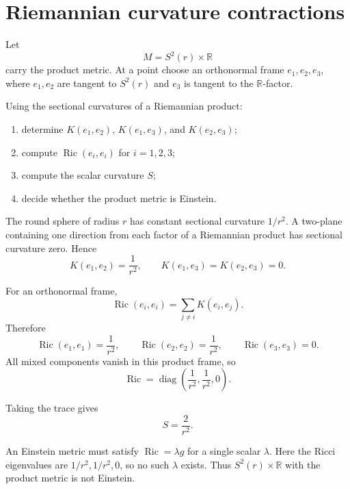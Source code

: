 
\section{Riemannian curvature contractions}

\begin{problem}
\label{prob:vii-gap-27}
Let
\[
M=S^2(r)\times\mathbb{R}
\]
carry the product metric.  At a point choose an orthonormal frame
\(e_1,e_2,e_3\), where \(e_1,e_2\) are tangent to \(S^2(r)\) and
\(e_3\) is tangent to the \(\mathbb{R}\)-factor.

Using the sectional curvatures of a Riemannian product:

\begin{enumerate}
\item determine \(K(e_1,e_2)\), \(K(e_1,e_3)\), and \(K(e_2,e_3)\);
\item compute \(\operatorname{Ric}(e_i,e_i)\) for \(i=1,2,3\);
\item compute the scalar curvature \(S\);
\item decide whether the product metric is Einstein.
\end{enumerate}
\end{problem}

\begin{solution}
The round sphere of radius \(r\) has constant sectional curvature
\(1/r^2\).  A two-plane containing one direction from each factor of a
Riemannian product has sectional curvature zero.  Hence
\[
K(e_1,e_2)=\frac1{r^2},
\qquad
K(e_1,e_3)=K(e_2,e_3)=0.
\]

For an orthonormal frame,
\[
\operatorname{Ric}(e_i,e_i)
 =\sum_{j\ne i}K(e_i,e_j).
\]
Therefore
\[
\operatorname{Ric}(e_1,e_1)=\frac1{r^2},
\qquad
\operatorname{Ric}(e_2,e_2)=\frac1{r^2},
\qquad
\operatorname{Ric}(e_3,e_3)=0.
\]
All mixed components vanish in this product frame, so
\[
\operatorname{Ric}
=
\operatorname{diag}\!\left(\frac1{r^2},\frac1{r^2},0\right).
\]

Taking the trace gives
\[
S=\frac2{r^2}.
\]

An Einstein metric must satisfy \(\operatorname{Ric}=\lambda g\) for a
single scalar \(\lambda\).  Here the Ricci eigenvalues are
\(1/r^2,1/r^2,0\), so no such \(\lambda\) exists.  Thus
\(S^2(r)\times\mathbb{R}\) with the product metric is not Einstein.
\end{solution}


